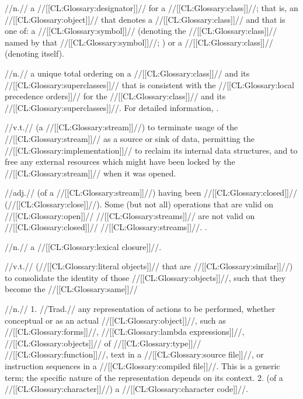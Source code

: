  //n.// a //[[CL:Glossary:designator]]// for a //[[CL:Glossary:class]]//; that is, an //[[CL:Glossary:object]]// that denotes a //[[CL:Glossary:class]]// and that is one of: a //[[CL:Glossary:symbol]]// (denoting the //[[CL:Glossary:class]]// named by that //[[CL:Glossary:symbol]]//; ) or a //[[CL:Glossary:class]]// (denoting itself).

 //n.// a unique total ordering on a //[[CL:Glossary:class]]// and its //[[CL:Glossary:superclasses]]// that is consistent with the //[[CL:Glossary:local precedence orders]]// for the //[[CL:Glossary:class]]// and its //[[CL:Glossary:superclasses]]//. For detailed information, \seesection\DeterminingtheCPL.

 //v.t.// (a //[[CL:Glossary:stream]]//) to terminate usage of the //[[CL:Glossary:stream]]// as a source or sink of data, permitting the //[[CL:Glossary:implementation]]// to reclaim its internal data structures, and to free any external resources which might have been locked by the
 //[[CL:Glossary:stream]]// when it was opened.

 //adj.// (of a //[[CL:Glossary:stream]]//) having been //[[CL:Glossary:closed]]// (\seeterm//[[CL:Glossary:close]]//). Some (but not all) operations that are valid on //[[CL:Glossary:open]]// //[[CL:Glossary:streams]]// are not valid on //[[CL:Glossary:closed]]// //[[CL:Glossary:streams]]//. \Seesection\OpenAndClosedStreams.

 //n.// a //[[CL:Glossary:lexical closure]]//.
 
 //v.t.// (//[[CL:Glossary:literal objects]]// that are //[[CL:Glossary:similar]]//) to consolidate the identity of those //[[CL:Glossary:objects]]//, such that they become the //[[CL:Glossary:same]]// %

 //n.// 1. //Trad.// any representation of actions to be performed, whether conceptual or as an actual //[[CL:Glossary:object]]//, such as //[[CL:Glossary:forms]]//, //[[CL:Glossary:lambda expressions]]//, //[[CL:Glossary:objects]]// of //[[CL:Glossary:type]]// //[[CL:Glossary:function]]//, text in a //[[CL:Glossary:source file]]//, or instruction sequences in a //[[CL:Glossary:compiled file]]//. This is a generic term; the specific nature of the representation depends on its context. 2. (of a //[[CL:Glossary:character]]//) a //[[CL:Glossary:character code]]//.


